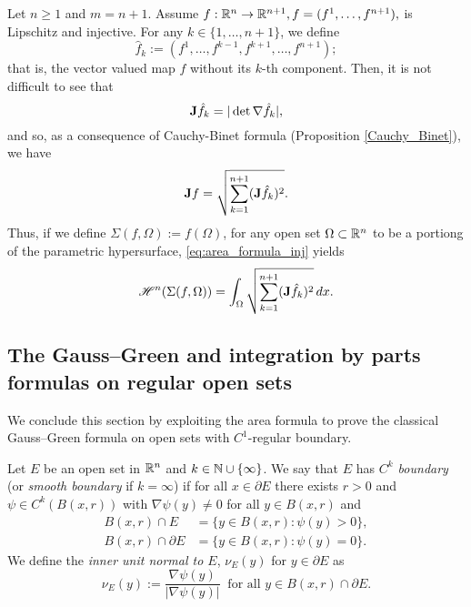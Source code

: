 \begin{example}
Let $n \ge 1$ and $m = n + 1$. Assume $f : \mathbb{R}^{n} \to \mathbb{R}^{n + 1}, f = (f^1, \dots, f^{n + 1}),$ is Lipschitz and injective. For any $k \in \{1, \dots, n + 1 \}$, we define $$\hat{f}_{k} := (f^{1}, \dots, f^{k - 1}, f^{k + 1}, \dots, f^{n + 1});$$
that is, the vector valued map $f$ without its $k$-th component. Then, it is not difficult to see that $${\bf J} \hat{f}_{k} = |\det{\nabla \hat{f}_{k}}|,$$
and so, as a consequence of Cauchy-Binet formula (Proposition \ref{Cauchy_Binet}), we have
\begin{equation*}
{\bf J} f = \sqrt{\sum_{k = 1}^{n + 1} ({\bf J} \hat{f}_{k})^{2}}.
\end{equation*}
Thus, if we define $\Sigma(f, \Omega) := f(\Omega)$, for any open set $\Omega \subset \mathbb{R}^{n}$ to be a portiong of the parametric hypersurface, \eqref{eq:area_formula_inj} yields
\begin{equation*}
\mathscr{H}^{n}(\Sigma(f, \Omega)) = \int_{\Omega} \sqrt{\sum_{k = 1}^{n + 1} ({\bf J} \hat{f}_{k})^{2}} \, dx.
\end{equation*}
\end{example}



\subsection{The Gauss--Green and integration by parts formulas on regular open sets}

We conclude this section by exploiting the area formula to prove the classical Gauss--Green formula on open sets with $C^1$-regular boundary.

\begin{definition}
Let $E$ be an open set in $\mathbb{R}^{n}$ and $k \in \mathbb{N} \cup \{\infty\}$. We say that $E$ has {\em $C^{k}$ boundary} (or {\em smooth boundary} if $k = \infty$) if for all $x \in \partial E$ there exists $r > 0$ and $\psi \in C^{k}(B(x, r))$ with $\nabla \psi(y) \neq 0$ for all $y \in B(x, r)$ and 
\begin{align*}
B(x, r) \cap E & = \{ y \in B(x, r) : \psi(y) > 0 \}, \\
B(x, r) \cap \partial E & = \{ y \in B(x, r) : \psi(y) = 0 \}.
\end{align*}
We define the {\em inner unit normal to $E$}, $\nu_{E}(y)$ for $y \in \partial E$ as 
\begin{equation*}
\nu_{E}(y) := \frac{\nabla \psi(y)}{|\nabla \psi(y)|} \ \text{ for all } y \in B(x, r) \cap \partial E.
\end{equation*}
\end{definition}


